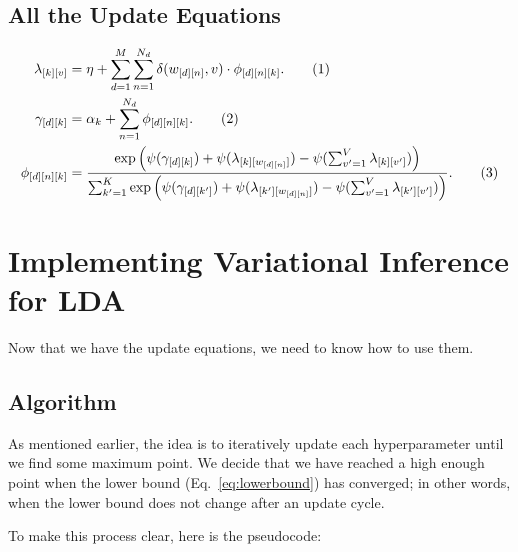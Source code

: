 \documentclass[12pt]{article}
\newcommand\numberthis{\addtocounter{equation}{1}\tag{\theequation}}
\begin{document}
\subsection{All the Update Equations}

\begin{align*}
    \lambda_{[k][v]} &= \eta + \sum_{d=1}^{M} \sum_{n=1}^{N_{d}}
    \delta(w_{[d][n]}, v)\cdot\phi_{[d][n][k]}.
    \numberthis\label{eq:lambdaupdate}
    \\*
    \gamma_{[d][k]} &= \alpha_{k} + \sum_{n=1}^{N_{d}} \phi_{[d][n][k]}.
    \numberthis\label{eq:gammaupdate}
    \\*
    \phi_{[d][n][k]} &= \frac{\exp \left( \psi(\gamma_{[d][k]})
    +
    \psi(\lambda_{[k][w_{[d][n]}]}) - \psi(\sum_{v'=1}^{V} \lambda_{[k][v']})
    \right)}
    {\sum_{k'=1}^{K} \exp \left( \psi(\gamma_{[d][k']})
    +
    \psi(\lambda_{[k'][w_{[d][n]}]}) - \psi(\sum_{v'=1}^{V}
    \lambda_{[k'][v']})
    \right)}.\numberthis\label{eq:phiupdate}
\end{align*}

\section{Implementing Variational Inference for LDA}

Now that we have the update equations, we need to know how to use them.

\subsection{Algorithm}

As mentioned earlier, the idea is to iteratively update each hyperparameter
until we find some maximum point.  We decide that we have reached a high enough
point when the lower bound (Eq.~\ref{eq:lowerbound}) has converged; in other
words, when the lower bound does not change after an update cycle.

To make this process clear, here is the pseudocode:
\end{document}
